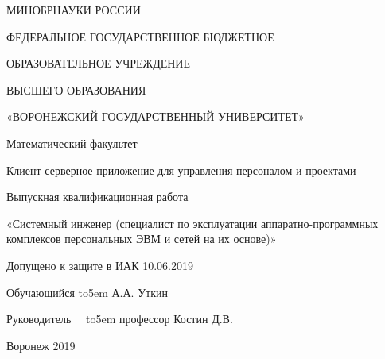 \begin{titlepage}
    \begin{center}
        МИНОБРНАУКИ РОССИИ

        ФЕДЕРАЛЬНОЕ ГОСУДАРСТВЕННОЕ БЮДЖЕТНОЕ

        ОБРАЗОВАТЕЛЬНОЕ УЧРЕЖДЕНИЕ

        ВЫСШЕГО ОБРАЗОВАНИЯ

        «ВОРОНЕЖСКИЙ ГОСУДАРСТВЕННЫЙ УНИВЕРСИТЕТ»

        \begin{spacing}{4}
        \end{spacing}

        Математический факультет
        \begin{spacing}{5.5}
        \end{spacing}


        Клиент-серверное приложение для управления персоналом и проектами
        \begin{spacing}{4.5}
        \end{spacing}


        Выпускная квалификационная работа 

        «Системный инженер (специалист по эксплуатации аппаратно-программных комплексов персональных ЭВМ и сетей на их основе)»

    \end{center}

    \begin{spacing}{5.5}
    \end{spacing}

    Допущено к защите в ИАК	 10.06.2019

    \begin{spacing}{2}
    \end{spacing}

    \begin{spacing}{2}
    \end{spacing}
    Обучающийся \def\hrf#1{\hbox to#1{\hrulefill}}
    \hrf{5em} А.А. Уткин
    \begin{spacing}{2}
    \end{spacing}
    Руководитель\ \ \def\hrf#1{\hbox to#1{\hrulefill}}
    \hrf{5em}
            профессор Костин Д.В.

    \begin{center}
        \begin{spacing}{4}
        \end{spacing}
        Воронеж 2019
    \end{center}
\end{titlepage}